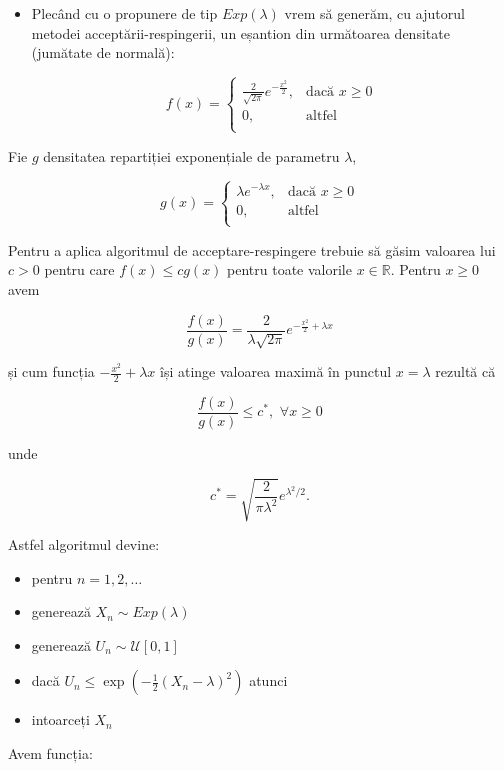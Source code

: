 \documentclass[]{article}
\newenvironment{frshaded*}{%
  \def\FrameCommand{\fboxrule=\FrameRule\fboxsep=\FrameSep \fcolorbox{framecolor}{shadecolor1}}%
  \MakeFramed {\advance\hsize-\width \FrameRestore}}%
{\endMakeFramed}
\newenvironment{rmdblock}[1]
  {\begin{frshaded*}
  \begin{itemize}
  \renewcommand{\labelitemi}{
    \raisebox{-.7\height}[0pt][0pt]{
      {\setkeys{Gin}{width=2em,keepaspectratio}\texttt{[image: images/icons/\#1]}}
    }
  }
  \item
  }
  {
  \end{itemize}
  \end{frshaded*}
  }
\newenvironment{rmdexercise}
  {\begin{rmdblock}{exercise}}
  {\end{rmdblock}}
\begin{document}
\begin{rmdexercise}
Plecând cu o propunere de tip \(Exp(\lambda)\) vrem să generăm, cu
ajutorul metodei acceptării-respingerii, un eșantion din următoarea
densitate (jumătate de normală):

\[
  f(x) = \left\{\begin{array}{ll}
    \frac{2}{\sqrt{2\pi}}e^{-\frac{x^2}{2}}, & \mbox{dacă $x\geq0$}\\
    0, & \mbox{altfel}\\           
  \end{array}\right.
\]
\end{rmdexercise}

Fie \(g\) densitatea repartiției exponențiale de parametru \(\lambda\),

\[
    g(x) = \left\{\begin{array}{ll}
        \lambda e^{-\lambda x}, & \mbox{dacă $x\geq0$}\\
        0, & \mbox{altfel}\\           
  \end{array}\right.
\]

Pentru a aplica algoritmul de acceptare-respingere trebuie să găsim
valoarea lui \(c>0\) pentru care \(f(x)\leq c g(x)\) pentru toate
valorile \(x\in \mathbb{R}\). Pentru \(x\geq0\) avem

\[
  \frac{f(x)}{g(x)}=\frac{2}{\lambda\sqrt{2\pi}}e^{-\frac{x^2}{2}+\lambda x}
\]

și cum funcția \(-\frac{x^2}{2}+\lambda x\) își atinge valoarea maximă
în punctul \(x=\lambda\) rezultă că

\[
    \frac{f(x)}{g(x)}\leq c^*, \,\,\forall x \geq0
\]

unde

\[
  c^*=\sqrt{\frac{2}{\pi\lambda^2}}e^{\lambda^2/2}.
\]

Astfel algoritmul devine:

\begin{itemize}
\item
  pentru \(n=1,2,\dots\)
\item
  generează \(X_n\sim Exp(\lambda)\)
\item
  generează \(U_n\sim\mathcal{U}[0,1]\)
\item
  dacă \(U_n\leq\exp\left(-\frac{1}{2}(X_n-\lambda)^2\right)\) atunci
\item
  intoarceți \(X_n\)
\end{itemize}

Avem funcția:
\end{document}
